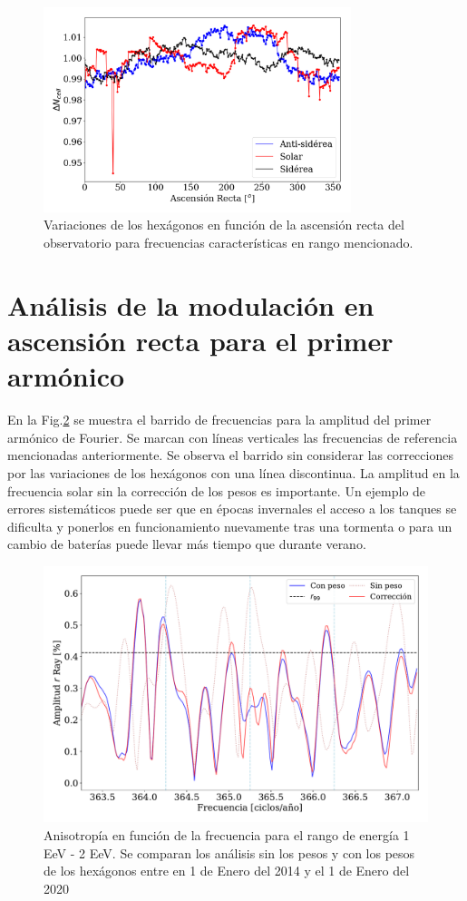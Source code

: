 			\begin{figure}[H]
				\centering
				\includegraphics[width=0.8\textwidth]{weights_2013_2020.png}
				\caption{Variaciones de los hexágonos en función de la ascensión recta del observatorio para frecuencias características en rango mencionado. }
				\label{pesos_bin_1_2}
			\end{figure}


\section{Análisis de la modulación en ascensión recta para el primer armónico}

En la Fig.\ref{anisotropia_rayleigh} se muestra el barrido de frecuencias para la amplitud del primer armónico de Fourier. Se marcan con líneas verticales las frecuencias de referencia mencionadas anteriormente. Se observa el barrido sin considerar las correcciones por las variaciones de los hexágonos con una línea discontinua. La  amplitud  en la frecuencia solar sin la corrección de los pesos es importante. Un ejemplo de errores sistemáticos puede ser que en épocas invernales el acceso a los tanques se dificulta y ponerlos en funcionamiento nuevamente tras una tormenta o para un cambio de baterías puede llevar más tiempo que durante verano. 

		\begin{figure}[H]
			\centering
			\includegraphics[width=0.75\linewidth]{pesos_sin_con_1_2_EeV.pdf}
			\caption{Anisotropía en función de la frecuencia para el rango de energía 1  EeV - 2 EeV. Se comparan los análisis sin los pesos y con los pesos de los hexágonos entre en 1 de Enero del 2014 y el 1 de Enero del 2020}
			\label{anisotropia_rayleigh}
		\end{figure}

